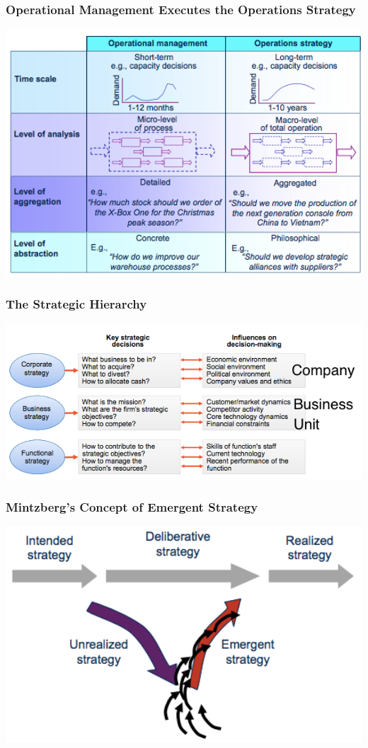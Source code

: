 \subsubsection{Operational Management Executes the Operations Strategy}
\includegraphics[width=1\textwidth]{W02/operations_strategy}
\subsubsection{The Strategic Hierarchy}
\includegraphics[width=1\textwidth]{W02/strategic_hierarchy}
\subsubsection{Mintzberg's Concept of Emergent Strategy}
\includegraphics[width=1\textwidth]{W02/mintzberg}
